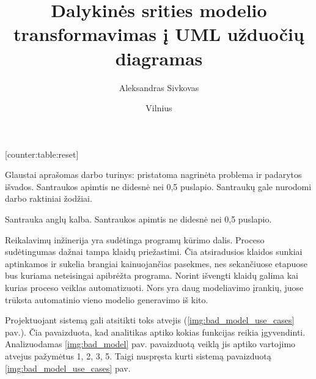 \documentclass{VUMIFInfBakalaurinis}
\title{Dalykinės srities modelio transformavimas į UML užduočių diagramas}
\author{Aleksandras Sivkovas}
\date{Vilnius \\ \the\year}
\begin{document}
[counter:table:reset]
\newcommand\rownumber{\stepcounter{counter:table}\arabic{counter:table}}

\maketitle

Glaustai aprašomas darbo turinys: pristatoma nagrinėta problema ir padarytos
išvados. Santraukos apimtis ne didesnė nei 0,5 puslapio. Santraukų gale
nurodomi darbo raktiniai žodžiai.

Santrauka anglų kalba. Santraukos apimtis ne didesnė nei 0,5 puslapio.

\tableofcontents



Reikalavimų inžinerija yra sudėtinga programų kūrimo dalis. Proceso sudėtingumas dažnai tampa klaidų priežastimi. Čia atsiradusios klaidos sunkiai aptinkamos ir sukelia brangiai kainuojančias pasekmes, nes sekančiuose etapuose bus kuriama neteisingai apibrėžta programa. Norint išvengti klaidų galima kai kurias proceso veiklas automatizuoti. Nors yra daug modeliavimo įrankių, juose trūksta automatinio vieno modelio generavimo iš kito.

Projektuojant sistemą gali atsitikti toks atvejis (\ref{img:bad_model_use_cases} pav.). Čia pavaizduota, kad analitikas aptiko kokias funkcijas reikia įgyvendinti. Analizuodamas \ref{img:bad_model} pav. pavaizduotą veiklą jis aptiko vartojimo atvejus pažymėtus 1, 2, 3, 5. Taigi nuspręsta kurti sistemą pavaizduotą  \ref{img:bad_model_use_cases} pav.
\end{document}
